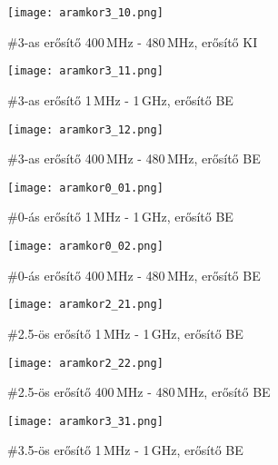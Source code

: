 \begin{figure}[!ht]
	\centering
	\texttt{[image: aramkor3\_10.png]}
	\caption{\#3-as erősítő 400\,MHz - 480\,MHz, erősítő KI}
	\label{fig:meres10}
\end{figure}

\begin{figure}[!ht]
	\centering
	\texttt{[image: aramkor3\_11.png]}
	\caption{\#3-as erősítő 1\,MHz - 1\,GHz, erősítő BE}
	\label{fig:meres11}
\end{figure}

\begin{figure}[!ht]
	\centering
	\texttt{[image: aramkor3\_12.png]}
	\caption{\#3-as erősítő 400\,MHz - 480\,MHz, erősítő BE}
	\label{fig:meres12}
\end{figure}



\begin{figure}[!ht]
	\centering
	\texttt{[image: aramkor0\_01.png]}
	\caption{\#0-ás erősítő 1\,MHz - 1\,GHz, erősítő BE}
	\label{fig:meres01}
\end{figure}

\begin{figure}[!ht]
	\centering
	\texttt{[image: aramkor0\_02.png]}
	\caption{\#0-ás erősítő 400\,MHz - 480\,MHz, erősítő BE}
	\label{fig:meres02}
\end{figure}



\begin{figure}[!ht]
	\centering
	\texttt{[image: aramkor2\_21.png]}
	\caption{\#2.5-ös erősítő 1\,MHz - 1\,GHz, erősítő BE}
	\label{fig:meres21}
\end{figure}

\begin{figure}[!ht]
	\centering
	\texttt{[image: aramkor2\_22.png]}
	\caption{\#2.5-ös erősítő 400\,MHz - 480\,MHz, erősítő BE}
	\label{fig:meres22}
\end{figure}



\begin{figure}[!ht]
	\centering
	\texttt{[image: aramkor3\_31.png]}
	\caption{\#3.5-ös erősítő 1\,MHz - 1\,GHz, erősítő BE}
	\label{fig:meres31}
\end{figure}

